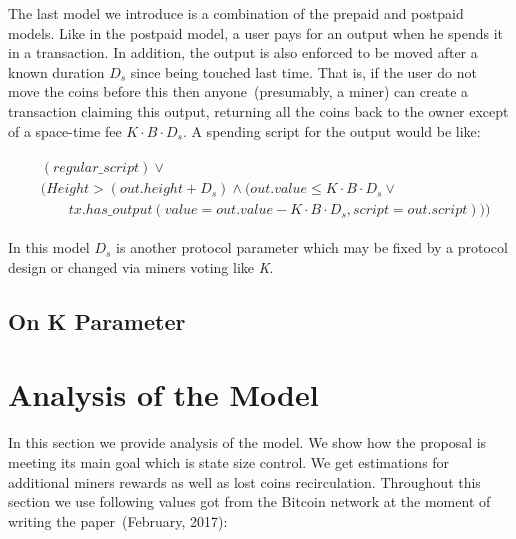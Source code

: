 \documentclass[]{llncs}   %
\newcommand{\authnote}[2]{\marginpar{\parbox{\marginparwidth}{\tiny %
  \textsf{#1 {\textcolor{blue}{notes: #2}}}}}%
  \textcolor{blue}{\textbf{\dag}}}
\newcommand{\authnote}[2]{
  \textsf{#1 \textcolor{blue}{: #2}}}
\newcommand{\authnote}[2]{}
\newcommand{\knote}[1]{{\authnote{\textcolor{green}{Alex notes}}{#1}}}
\begin{document}
The last model we introduce is a combination of the prepaid and postpaid models. Like in the postpaid model, a user pays for an output when he spends it in a transaction. In addition, the output is also enforced to be moved after a known duration $D_{s}$ since being touched last time. That is, if the user do not move the coins before this then anyone~(presumably, a miner) can create a transaction claiming this output, returning all the coins back to the owner except of a space-time fee ${K \cdot B \cdot D_{s}}$. A spending script for the output would be like:

\begin{align}
\begin{split}
&(regular\_script) \lor \\
&(Height > (out.height + D_s) \land (out.value \le K \cdot B \cdot D_s \lor \\  
&\qquad tx.has\_output(value = out.value - K \cdot B \cdot D_s, script = out.script)))
\end{split}
\end{align}

In this model $D_s$ is another protocol parameter which may be fixed by a protocol design or changed via miners voting like \textit{K}.

\subsection{On K Parameter}
\label{sec-kparameter}

\knote{todo: choose proper title for the sub-section and fill the description}


\section{Analysis of the Model}
\label{sec:analysis}

In this section we provide analysis of the model. We show how the proposal is meeting its main goal which is state size control. We get estimations for additional miners rewards as well as lost coins recirculation. Throughout this section we use following values got from the Bitcoin network at the moment of writing the paper~(February, 2017):
\end{document}
